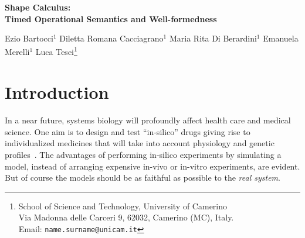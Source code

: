 \documentclass[11pt]{article}
\begin{document}
\vspace{1cm}
\begin{center}
{\Large\bf Shape Calculus:\\ Timed Operational Semantics and Well-formedness}
\end{center}
\vspace{4mm}

\begin{center}
{\large Ezio Bartocci$^1$ \qquad
Diletta Romana Cacciagrano$^1$ \qquad
Maria \nolinebreak[4] Rita \nolinebreak[4] Di \nolinebreak[4] Berardini$^1$ \qquad
Emanuela Merelli$^1$ \qquad
Luca Tesei}\footnote{School of Science and Technology, University of Camerino\\
Via Madonna delle Carceri 9, 62032, Camerino (MC), Italy.\\ Email:
\texttt{name.surname@unicam.it}}
\end{center}

\vspace{3ex}

\date{\ }


\begin{abstract}
The Shape Calculus is a bio-inspired calculus for describing 3D shapes moving in a space. A shape forms a 3D process when combined with a behaviour. Behaviours are specified with a timed CCS-like process algebra using a notion of channel that models naturally binding sites on the surface of shapes. Processes can represent molecules or other mobile objects and can be part of networks of processes that move simultaneously and interact in a given geometrical space. The calculus embeds collision detection and response, binding of compatible 3D processes and splitting of previously established bonds. In this work the full formal timed operational semantics of the calculus is provided, together with examples that illustrate the use of the calculus in a well-known biological scenario. Moreover, a result of well-formedness about the evolution of a given network of well-formed 3D processes is proved.
\end{abstract}

\section{Introduction}

In a near future, systems biology will profoundly affect health care and medical science. One aim is to design and test ``in-silico'' drugs giving rise to individualized medicines that will take into account physiology and genetic profiles~\cite{Finkelstein2004}. The advantages of performing in-silico experiments by simulating a model, instead of arranging expensive in-vivo or in-vitro experiments, are evident. But of course the models should be as faithful as possible to the \emph{real system}.
\end{document}
